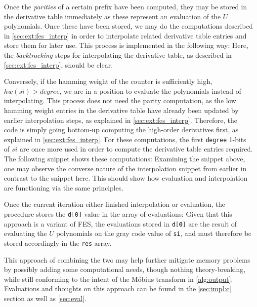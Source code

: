 Once the \textit{parities} of a certain prefix have been computed, they may be stored in the derivative table immediately as these represent an evaluation of the $U$ polynomials. Once these have been stored, we may do the computations described in \cref{sec:ext:fes_interp} in order to interpolate related derivative table entries and store them for later use. This process is implemented in the following way:
Here, the \textit{backtracking} steps for interpolating the derivative table, as described in \cref{sec:ext:fes_interp}, should be clear.

Conversely, if the hamming weight of the counter is sufficiently high, $hw(si) > degree$, we are in a position to evaluate the polynomials instead of interpolating. This process does not need the parity computation, as the low hamming weight entries in the derivative table have already been updated by earlier interpolation steps, as explained in \cref{sec:ext:fes_interp}. Therefore, the code is simply going bottom-up computing the high-order derivatives first, as explained in \cref{sec:ext:fes_interp}. For these computations, the first \texttt{degree} 1-bits of $si$ are once more used in order to compute the derivative table entries required. The following snippet shows these computations:
Examining the snippet above, one may observe the converse nature of the interpolation snippet from earlier in contrast to the snippet here. This should show how evaluation and interpolation are functioning via the same principles.

Once the current iteration either finished interpolation or evaluation, the procedure stores the \texttt{d[0]} value in the array of evaluations:
Given that this approach is a variant of FES, the evaluations stored in \texttt{d[0]} are the result of evaluating the $U$ polynomials on the gray code value of \texttt{si}, and must therefore be stored accordingly in the \texttt{res} array.

This approach of combining the two may help further mitigate memory problems by possibly adding some computational needs, though nothing theory-breaking, while still conforming to the intent of the Möbius transform in \cref{alg:output}. Evaluations and thoughts on this approach can be found in the \cref{sec:impl:c} section as well as \cref{sec:eval}.

